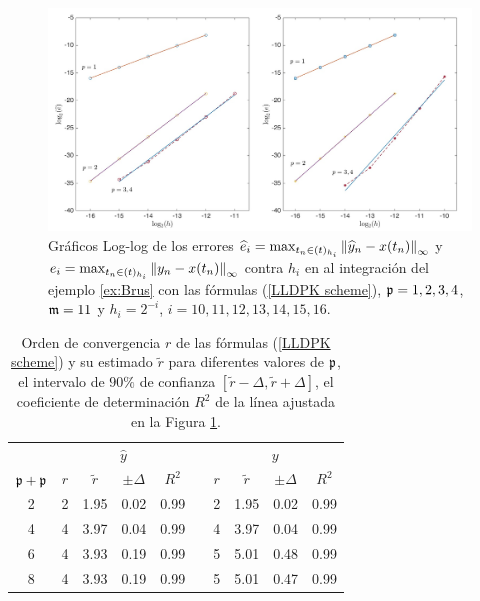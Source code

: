\begin{figure}[htb]
	\begin{center}
		\includegraphics[scale=0.45]{Graphics/lldp/p-plots.jpg}
		\caption{Gráficos Log-log de los errores $\widehat{e}_i=\max_{t_n\in(t)_{h_i}}\left\lVert \widehat{y}_n-x(t_n) \right\rVert_\infty$ y $e_i=\max_{t_n\in(t)_{h_i}}\left\lVert y_n-x(t_n) \right\rVert_\infty$ contra $h_i$ en al integración del ejemplo \ref{ex:Brus} con las fórmulas (\ref{LLDPK scheme}), $\mathfrak{p}=1,2,3,4$, $\mathfrak{m}=11$ y $h_i=2^{-i}$, $i=10,11,12,13,14,15,16$.}
		\label{fig:num-exp-lldp-fix-step:Fig2}
	\end{center}
\end{figure}


\begin{table}[htb]
	\centering
	\caption{
		Orden de convergencia $r$ de las fórmulas (\ref{LLDPK scheme}) y su estimado  $\widetilde{r}$ para diferentes valores de $\mathfrak{p}$, el intervalo de $90\%$ de confianza $[\widetilde{r}-\varDelta,\widetilde{r}+\varDelta]$, el coeficiente de determinación $R^2$ de la línea ajustada en la Figura \ref{fig:num-exp-lldp-fix-step:Fig2}.}
		\begin{tabular}{ c  c c c c  c  c c c c}
			\hline
			& \multicolumn{4}{c}{$\widehat{y}$} & & \multicolumn{4}{c}{$y$} \\
			\cline{2-5} \cline{7-10}
			$\mathfrak{p}+\mathfrak{p}$ & $r$ & $\widetilde{r}$ & $\pm\varDelta$ & $R^2$ & & $r$ & $\widetilde{r}$ & $\pm\varDelta$ & $R^2$ \\
			\hline
			2 & 2 & 1.95 & 0.02 & 0.99 & & 2 & 1.95 & 0.02 & 0.99 \\
			4 & 4 & 3.97 & 0.04 & 0.99 & & 4 & 3.97 & 0.04 & 0.99 \\
			6 & 4 & 3.93 & 0.19 & 0.99 & & 5 & 5.01 & 0.48 & 0.99 \\
			8 & 4 & 3.93 & 0.19 & 0.99 & & 5 & 5.01 & 0.47 & 0.99 \\
			\hline
		\end{tabular}
	\label{tab:num-exp-lldp-fix-step:porders}
\end{table}

